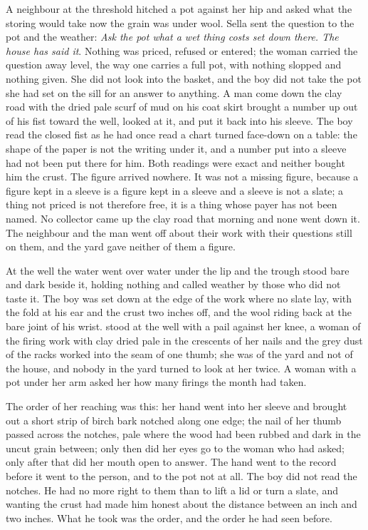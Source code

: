 A neighbour at the threshold hitched a pot against her hip and asked what the storing would take now the grain was under wool. Sella sent the question to the pot and the weather: \emph{Ask the pot what a wet thing costs set down there. The house has said it}. Nothing was priced, refused or entered; the woman carried the question away level, the way one carries a full pot, with nothing slopped and nothing given. She did not look into the basket, and the boy did not take the pot she had set on the sill for an answer to anything. A man come down the clay road with the dried pale scurf of mud on his coat skirt brought a number up out of his fist toward the well, looked at it, and put it back into his sleeve. The boy read the closed fist as he had once read a chart turned face-down on a table: the shape of the paper is not the writing under it, and a number put into a sleeve had not been put there for him. Both readings were exact and neither bought him the crust. The figure arrived nowhere. It was not a missing figure, because a figure kept in a sleeve is a figure kept in a sleeve and a sleeve is not a slate; a thing not priced is not therefore free, it is a thing whose payer has not been named. No collector came up the clay road that morning and none went down it. The neighbour and the man went off about their work with their questions still on them, and the yard gave neither of them a figure.

\scenebreak

At the well the water went over water under the lip and the trough stood bare and dark beside it, holding nothing and called weather by those who did not taste it. The boy was set down at the edge of the work where no slate lay, with the fold at his ear and the crust two inches off, and the wool riding back at the bare joint of his wrist.  stood at the well with a pail against her knee, a woman of the firing work with clay dried pale in the crescents of her nails and the grey dust of the racks worked into the seam of one thumb; she was of the yard and not of the house, and nobody in the yard turned to look at her twice. A woman with a pot under her arm asked her how many firings the month had taken.

The order of her reaching was this: her hand went into her sleeve and brought out a short strip of birch bark notched along one edge; the nail of her thumb passed across the notches, pale where the wood had been rubbed and dark in the uncut grain between; only then did her eyes go to the woman who had asked; only after that did her mouth open to answer. The hand went to the record before it went to the person, and to the pot not at all. The boy did not read the notches. He had no more right to them than to lift a lid or turn a slate, and wanting the crust had made him honest about the distance between an inch and two inches. What he took was the order, and the order he had seen before.

